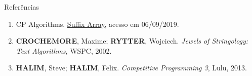 \begin{frame}[fragile]{Referências}

    \begin{enumerate}
        \item CP Algorithms. \href{https://cp-algorithms.com/string/suffix-array.html}{Suffix Array}, acesso em 06/09/2019.
 
        \item \textbf{CROCHEMORE}, Maxime; \textbf{RYTTER}, Wojciech. \textit{Jewels of Stringology: Text Algorithms}, WSPC, 2002.

        \item \textbf{HALIM}, Steve; \textbf{HALIM}, Felix. \textit{Competitive Programming 3}, Lulu, 2013.
    \end{enumerate}

\end{frame}
